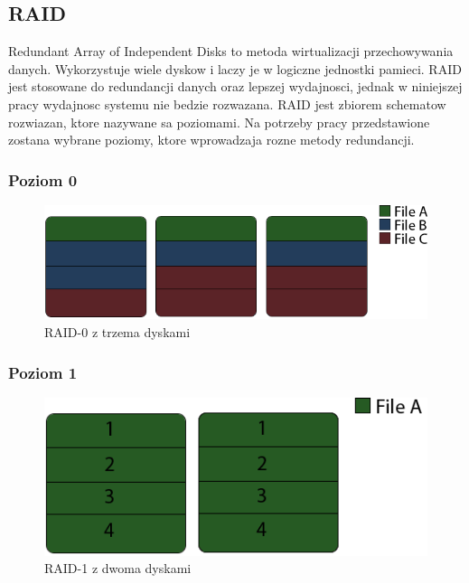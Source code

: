 \subsection {RAID}
Redundant Array of Independent Disks to metoda wirtualizacji przechowywania danych. Wykorzystuje wiele dyskow i laczy je w logiczne jednostki pamieci. RAID jest stosowane do redundancji danych oraz lepszej wydajnosci, jednak w niniejszej pracy wydajnosc systemu nie bedzie rozwazana.  
RAID jest zbiorem schematow rozwiazan, ktore nazywane sa poziomami. Na potrzeby pracy przedstawione zostana wybrane poziomy, ktore wprowadzaja rozne metody redundancji.
\subsubsection{Poziom 0}
\begin{figure}[h!]
        \centering
        \includegraphics{raid-0.png}
        \caption{RAID-0 z trzema dyskami}
        \label{fig:raid0}
\end{figure}
\subsubsection{Poziom 1}
\begin{figure}[h!]
        \centering
        \includegraphics{raid-1.png}
        \caption{RAID-1 z dwoma dyskami}
        \label{fig:raid1}
\end{figure}

